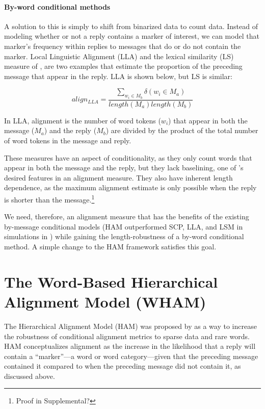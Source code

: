 \documentclass[11pt]{article}
\begin{document}
\paragraph{By-word conditional methods} A solution to this is simply to shift from binarized data to count data. Instead of modeling whether or not a reply contains a marker of interest, we can model that marker's frequency within replies to messages that do or do not contain the marker.  Local Linguistic Alignment (LLA) \cite{FusaroliEtAl2012,WangReitterYen2014} and the lexical similarity (LS) measure of \cite{HealeyPurverHowes2014}, are two examples that estimate the proportion of the preceding message that appear in the reply. LLA is shown below, but LS is similar:

\begin{equation}
align_{LLA} = \frac{\sum_{w_i \in M_b} \delta(w_i \in M_a)}{length(M_a)length(M_b)}
\end{equation}

In LLA, alignment is the number of word tokens ($w_i$) that appear in both the message ($M_a$) and the reply ($M_b$) are divided by the product of the total number of word tokens in the message and reply. 

These measures have an aspect of conditionality, as they only count words that appear in both the message and the reply, but they lack baselining, one of \cite{DoyleYurovskyFrank2016}'s desired features in an alignment measure.  They also have inherent length dependence, as the maximum alignment estimate is only possible when the reply is shorter than the message.\footnote{Proof in Supplemental?}

We need, therefore, an alignment measure that has the benefits of the existing by-message conditional models (HAM outperformed SCP, LLA, and LSM in simulations in \cite{DoyleYurovskyFrank2016}) while gaining the length-robustness of a by-word conditional method.  A simple change to the HAM framework satisfies this goal.

\section{The Word-Based Hierarchical Alignment Model (WHAM)}

The Hierarchical Alignment Model (HAM) was proposed by \cite{DoyleYurovskyFrank2016} as a way to increase the robustness of conditional alignment metrics to sparse data and rare words. HAM conceptualizes alignment as the increase in the likelihood that a reply will contain a ``marker''---a word or word category---given that the preceding message contained it compared to when the preceding message did not contain it, as discussed above.
\end{document}
